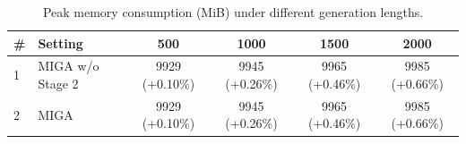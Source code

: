 \documentclass{article}
\theoremstyle{plain}
\theoremstyle{definition}
\theoremstyle{remark}
\begin{document}
\begin{table}[htbp]
    \centering
    \small
    \caption{Peak memory consumption (MiB) under different generation lengths.}
    \label{tab:memory_analysis}
    \begin{tabular}{l lcccc}
        \toprule
        \textbf{\#} & \textbf{Setting}  & \textbf{500} & \textbf{1000} & \textbf{1500} & \textbf{2000} \\
        \midrule
        1 & MIGA w/o Stage 2 & 9929 (+0.10\%) & 9945 (+0.26\%) & 9965 (+0.46\%) & 9985 (+0.66\%)  \\
        2 & MIGA             & 9929 (+0.10\%) & 9945 (+0.26\%) & 9965 (+0.46\%) & 9985 (+0.66\%)  \\
        \bottomrule
    \end{tabular}
\end{table}
\end{document}
